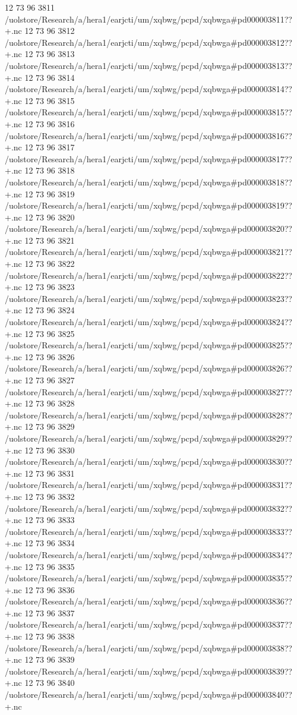 12 73 96
3811
/uolstore/Research/a/hera1/earjcti/um/xqbwg/pcpd/xqbwga#pd000003811??+.nc
12 73 96
3812
/uolstore/Research/a/hera1/earjcti/um/xqbwg/pcpd/xqbwga#pd000003812??+.nc
12 73 96
3813
/uolstore/Research/a/hera1/earjcti/um/xqbwg/pcpd/xqbwga#pd000003813??+.nc
12 73 96
3814
/uolstore/Research/a/hera1/earjcti/um/xqbwg/pcpd/xqbwga#pd000003814??+.nc
12 73 96
3815
/uolstore/Research/a/hera1/earjcti/um/xqbwg/pcpd/xqbwga#pd000003815??+.nc
12 73 96
3816
/uolstore/Research/a/hera1/earjcti/um/xqbwg/pcpd/xqbwga#pd000003816??+.nc
12 73 96
3817
/uolstore/Research/a/hera1/earjcti/um/xqbwg/pcpd/xqbwga#pd000003817??+.nc
12 73 96
3818
/uolstore/Research/a/hera1/earjcti/um/xqbwg/pcpd/xqbwga#pd000003818??+.nc
12 73 96
3819
/uolstore/Research/a/hera1/earjcti/um/xqbwg/pcpd/xqbwga#pd000003819??+.nc
12 73 96
3820
/uolstore/Research/a/hera1/earjcti/um/xqbwg/pcpd/xqbwga#pd000003820??+.nc
12 73 96
3821
/uolstore/Research/a/hera1/earjcti/um/xqbwg/pcpd/xqbwga#pd000003821??+.nc
12 73 96
3822
/uolstore/Research/a/hera1/earjcti/um/xqbwg/pcpd/xqbwga#pd000003822??+.nc
12 73 96
3823
/uolstore/Research/a/hera1/earjcti/um/xqbwg/pcpd/xqbwga#pd000003823??+.nc
12 73 96
3824
/uolstore/Research/a/hera1/earjcti/um/xqbwg/pcpd/xqbwga#pd000003824??+.nc
12 73 96
3825
/uolstore/Research/a/hera1/earjcti/um/xqbwg/pcpd/xqbwga#pd000003825??+.nc
12 73 96
3826
/uolstore/Research/a/hera1/earjcti/um/xqbwg/pcpd/xqbwga#pd000003826??+.nc
12 73 96
3827
/uolstore/Research/a/hera1/earjcti/um/xqbwg/pcpd/xqbwga#pd000003827??+.nc
12 73 96
3828
/uolstore/Research/a/hera1/earjcti/um/xqbwg/pcpd/xqbwga#pd000003828??+.nc
12 73 96
3829
/uolstore/Research/a/hera1/earjcti/um/xqbwg/pcpd/xqbwga#pd000003829??+.nc
12 73 96
3830
/uolstore/Research/a/hera1/earjcti/um/xqbwg/pcpd/xqbwga#pd000003830??+.nc
12 73 96
3831
/uolstore/Research/a/hera1/earjcti/um/xqbwg/pcpd/xqbwga#pd000003831??+.nc
12 73 96
3832
/uolstore/Research/a/hera1/earjcti/um/xqbwg/pcpd/xqbwga#pd000003832??+.nc
12 73 96
3833
/uolstore/Research/a/hera1/earjcti/um/xqbwg/pcpd/xqbwga#pd000003833??+.nc
12 73 96
3834
/uolstore/Research/a/hera1/earjcti/um/xqbwg/pcpd/xqbwga#pd000003834??+.nc
12 73 96
3835
/uolstore/Research/a/hera1/earjcti/um/xqbwg/pcpd/xqbwga#pd000003835??+.nc
12 73 96
3836
/uolstore/Research/a/hera1/earjcti/um/xqbwg/pcpd/xqbwga#pd000003836??+.nc
12 73 96
3837
/uolstore/Research/a/hera1/earjcti/um/xqbwg/pcpd/xqbwga#pd000003837??+.nc
12 73 96
3838
/uolstore/Research/a/hera1/earjcti/um/xqbwg/pcpd/xqbwga#pd000003838??+.nc
12 73 96
3839
/uolstore/Research/a/hera1/earjcti/um/xqbwg/pcpd/xqbwga#pd000003839??+.nc
12 73 96
3840
/uolstore/Research/a/hera1/earjcti/um/xqbwg/pcpd/xqbwga#pd000003840??+.nc

